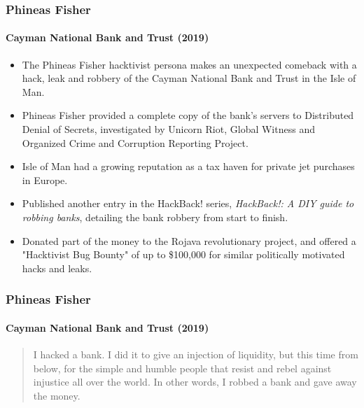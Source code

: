 \documentclass[aspectratio=169,usenames,dvipsnames]{beamer}
\begin{document}
\begin{frame}
  \frametitle{Phineas Fisher}
  \framesubtitle{Cayman National Bank and Trust (2019)}

  \begin{itemize}[<+->]
    \item The Phineas Fisher hacktivist persona makes an unexpected comeback
      with a hack, leak and robbery of the Cayman National Bank and Trust in
      the Isle of Man.
    \item Phineas Fisher provided a complete copy of the bank's servers to
      Distributed Denial of Secrets, investigated by Unicorn Riot, Global
      Witness and Organized Crime and Corruption Reporting Project.
    \item Isle of Man had a growing reputation as a tax haven for private jet
      purchases in Europe.
    \item Published another entry in the HackBack! series, \emph{HackBack!: A
      DIY guide to robbing banks}, detailing the bank robbery from start to
      finish.
    \item Donated part of the money to the Rojava revolutionary project, and
      offered a "Hacktivist Bug Bounty" of up to \$100,000 for similar
      politically motivated hacks and leaks.
  \end{itemize}

\end{frame}

\begin{frame}[c]
  \frametitle{Phineas Fisher}
  \framesubtitle{Cayman National Bank and Trust (2019)}

  \begin{quote}
    I hacked a bank. I did it to give an injection of liquidity, but this time
    from below, for the simple and humble people that resist and rebel against
    injustice all over the world. In other words, I robbed a bank and gave
    away the money.
  \end{quote}

\end{frame}
\end{document}
